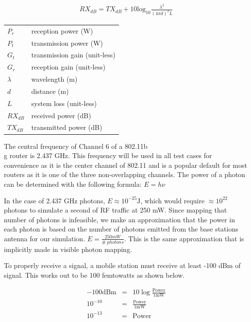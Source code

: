 \documentclass[%
        final,
        notitlepage,
        narroweqnarray,
        inline,
        twoside,
        ]{ieee}
\begin{document}
\begin{eqnarray}
RX_{dB} = TX_{dB} + 10\mathrm{log_{10}} \frac{\lambda^2}{(4 \pi d)^2 L}
\label{Friis}
\end{eqnarray}

\vspace{5mm}
\begin{tabular}{|l|l|}
\hline
$ P_r$ & reception power (W) \\
$ P_t$ & transmission power (W) \\
$ G_t$ & transmission gain (unit-less) \\
$ G_r$ & reception gain (unit-less) \\
$ \lambda$ & wavelength (m) \\
$ d$ & distance (m) \\
$ L$ & system loss (unit-less) \\
$ RX_{dB}$ & received power (dB) \\
$ TX_{dB}$ & transmitted power (dB) \\
\hline
\end{tabular}
\vspace{5mm}

The central frequency of Channel 6 of a 802.11b\\g router is 2.437 GHz. This frequency
will be used in all test cases for convenience as it is the center channel of 802.11 and
is a popular default for most routers as it is one of the three non-overlapping channels. 
The power of a photon can be determined with the following formula: $E = h\nu$

In the case of 2.437 GHz photons, $E \approx 10^{-25} \mathrm{J}$, which would require $\approx 10^{22}$
photons to simulate a second of RF traffic at 250 mW. Since mapping that number of photons is infeasible, 
we make an approximation that the power in each photon is based on the number of photons emitted from the base 
stations antenna for our simulation. $E = \frac{250mW}{\#\;photons}$. This is the same approximation that is
implicitly made in visible photon mapping.

To properly receive a signal, a mobile station must receive at least -100 dBm of signal. 
This works out to be 100 femtowatts as shown below.

\begin{eqnarray}
	-100 \mathrm{dBm} & = & 10\log\frac{\mathrm{Power}}{1\mathrm{mW}} \\
	10^{-10} & = & \frac{\mathrm{Power}}{1\mathrm{mW}} \\
	10^{-13} & = & \mathrm{Power}
\end{eqnarray}
\end{document}
